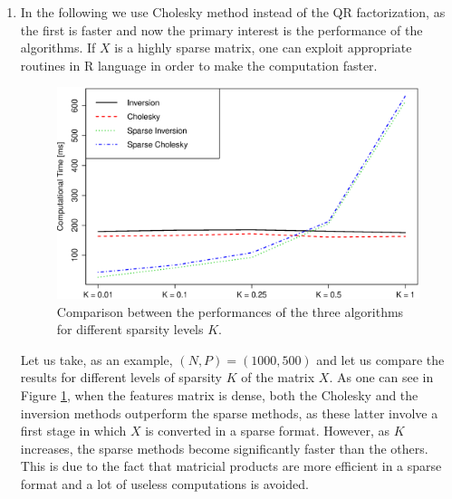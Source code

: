 \documentclass{homework}
\begin{document}
\begin{enumerate}[label=(\Alph*)]
\item In the following we use Cholesky method instead of the QR factorization, as the first is faster and now the primary interest is the performance of the algorithms. If $X$ is a highly sparse matrix, one can exploit appropriate routines in R language in order to make the computation faster. 

\begin{figure}[!ht]
\centering
\includegraphics[width=0.6\columnwidth]{./Img/perf_2}
\caption{Comparison between the performances of the three algorithms for different sparsity levels $K$.}
\label{fig:perf2}
\end{figure}

Let us take, as an example, $(N, P) = (1000,500)$ and let us compare the results for different levels of sparsity $K$ of the matrix $X$. As one can see in Figure \ref{fig:perf2}, when the features matrix is dense, both the Cholesky and the inversion methods outperform the sparse methods, as these latter involve a first stage in which $X$ is converted in a sparse format. However, as $K$ increases, the sparse methods become significantly faster than the others. This is due to the fact that matricial products are more efficient in a sparse format and a lot of useless computations is avoided.

\end{enumerate}

\end{document}
